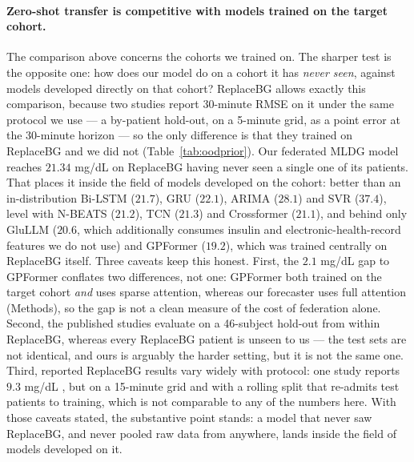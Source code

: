 \documentclass[10pt,letterpaper]{article}
\begin{document}
\paragraph{Zero-shot transfer is competitive with models trained on the target
cohort.} The comparison above concerns the cohorts we trained on. The sharper test
is the opposite one: how does our model do on a cohort it has \emph{never seen},
against models developed directly on that cohort? ReplaceBG allows exactly this
comparison, because two studies report 30-minute RMSE on it under the same
protocol we use --- a by-patient hold-out, on a 5-minute grid, as a point error at
the 30-minute horizon --- so the only difference is that they trained on ReplaceBG
and we did not (Table~\ref{tab:oodprior}). Our federated MLDG model reaches
$21.34$ mg/dL on ReplaceBG having never seen a single one of its patients. That
places it inside the field of models developed on the cohort: better than an
in-distribution Bi-LSTM ($21.7$), GRU ($22.1$), ARIMA ($28.1$) and SVR ($37.4$),
level with N-BEATS ($21.2$), TCN ($21.3$) and Crossformer ($21.1$), and behind
only GluLLM ($20.6$, which additionally consumes insulin and electronic-health-record
features we do not use) and GPFormer ($19.2$), which was trained centrally on
ReplaceBG itself. Three caveats keep this honest. First, the $2.1$ mg/dL gap to
GPFormer conflates two differences, not one: GPFormer both trained on the target
cohort \emph{and} uses sparse attention, whereas our forecaster uses full
attention (Methods), so the gap is not a clean measure of the cost of federation
alone. Second, the published studies evaluate on a 46-subject hold-out from within
ReplaceBG, whereas every ReplaceBG patient is unseen to us --- the test sets are
not identical, and ours is arguably the harder setting, but it is not the same
one. Third, reported ReplaceBG results vary widely with protocol: one study
reports $9.3$ mg/dL \cite{jaloli2023cnnlstm}, but on a 15-minute grid and with a
rolling split that re-admits test patients to training, which is not comparable to
any of the numbers here. With those caveats stated, the substantive point stands:
a model that never saw ReplaceBG, and never pooled raw data from anywhere, lands
inside the field of models developed on it.
\end{document}
